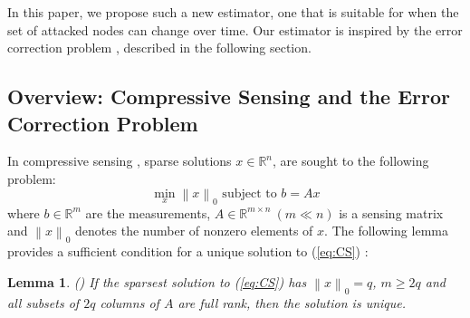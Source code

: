 \documentclass[twocolumn]{autart}    %
\newcommand{\norm}[1]{\left\lVert#1\right\rVert}
\newtheorem{Lem}{\bf{Lemma}}
\newcommand{\rev}[1]{{\normalsize{{{\color{blue}#1}}}}}
\begin{document}
In this paper, we propose such a new \rev{estimator}, one that is suitable for when the set of attacked nodes can change over time. Our \rev{estimator} is inspired by the error correction problem \cite{Candes_Tao}, described in the following section. %
\vspace{-0.4cm}
\subsection{Overview: Compressive Sensing and the Error Correction Problem \cite{Candes_Tao}} \label{sec:error_correction}
\vspace{-0.4cm}
In compressive sensing \cite{Candes_Tao}, sparse solutions $x\in \mathbb{R}^n$, are sought to the following problem:
\begin{equation}
	\min_x \norm{x}_0 \text{ subject to } b= Ax
	\label{eq:CS}
\end{equation}
where $b \in \mathbb{R}^m$ are the measurements, $A \in \mathbb{R}^{m\times n}~ (m \ll n)$ is a sensing matrix and $\norm{x}_0$ denotes the number of nonzero elements of $x$. The following lemma provides a sufficient condition for a unique solution to (\ref{eq:CS}) \cite{Candes_Tao}:
\vspace{-0.2cm}
\begin{Lem} \emph{(\hspace{1sp}\cite{David_Chang})} \label{lem:CS}
If the sparsest solution to (\ref{eq:CS}) has $\norm{x}_0 = q$, $m\ge 2q$ and all subsets of $2q$ columns of $A$ are full rank, then the solution is unique. 
\end{Lem}
\vspace{-0.2cm}
\end{document}

